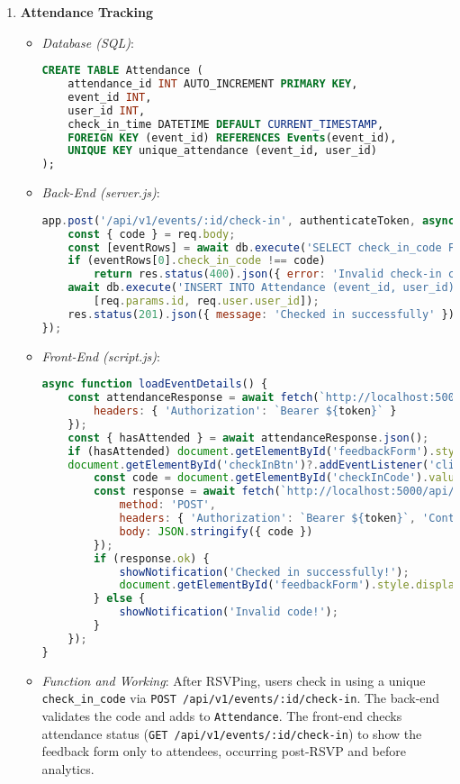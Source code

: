 \documentclass[12pt]{article}
\begin{document}
\begin{enumerate}
    \item \textbf{Attendance Tracking}
        \begin{itemize}
            \item \textit{Database (SQL)}:
\begin{lstlisting}[language=SQL, caption={Attendance Table}]
CREATE TABLE Attendance (
    attendance_id INT AUTO_INCREMENT PRIMARY KEY,
    event_id INT,
    user_id INT,
    check_in_time DATETIME DEFAULT CURRENT_TIMESTAMP,
    FOREIGN KEY (event_id) REFERENCES Events(event_id),
    UNIQUE KEY unique_attendance (event_id, user_id)
);
\end{lstlisting}
            \item \textit{Back-End (server.js)}:
\begin{lstlisting}[language=JavaScript, caption={Check-In Endpoint}]
app.post('/api/v1/events/:id/check-in', authenticateToken, async (req, res) => {
    const { code } = req.body;
    const [eventRows] = await db.execute('SELECT check_in_code FROM Events WHERE event_id = ?', [req.params.id]);
    if (eventRows[0].check_in_code !== code) 
        return res.status(400).json({ error: 'Invalid check-in code' });
    await db.execute('INSERT INTO Attendance (event_id, user_id) VALUES (?, ?)', 
        [req.params.id, req.user.user_id]);
    res.status(201).json({ message: 'Checked in successfully' });
});
\end{lstlisting}
            \item \textit{Front-End (script.js)}:
\begin{lstlisting}[language=JavaScript, caption={Check-In Logic}]
async function loadEventDetails() {
    const attendanceResponse = await fetch(`http://localhost:5000/api/v1/events/${eventId}/check-in`, {
        headers: { 'Authorization': `Bearer ${token}` }
    });
    const { hasAttended } = await attendanceResponse.json();
    if (hasAttended) document.getElementById('feedbackForm').style.display = 'block';
    document.getElementById('checkInBtn')?.addEventListener('click', async () => {
        const code = document.getElementById('checkInCode').value;
        const response = await fetch(`http://localhost:5000/api/v1/events/${eventId}/check-in`, {
            method: 'POST',
            headers: { 'Authorization': `Bearer ${token}`, 'Content-Type': 'application/json' },
            body: JSON.stringify({ code })
        });
        if (response.ok) {
            showNotification('Checked in successfully!');
            document.getElementById('feedbackForm').style.display = 'block';
        } else {
            showNotification('Invalid code!');
        }
    });
}
\end{lstlisting}
            \item \textit{Function and Working}: 
                After RSVPing, users check in using a unique \texttt{check\_in\_code} via \texttt{POST /api/v1/events/:id/check-in}. The back-end validates the code and adds to \texttt{Attendance}. The front-end checks attendance status (\texttt{GET /api/v1/events/:id/check-in}) to show the feedback form only to attendees, occurring post-RSVP and before analytics.
        \end{itemize}


\end{enumerate}
\end{document}
